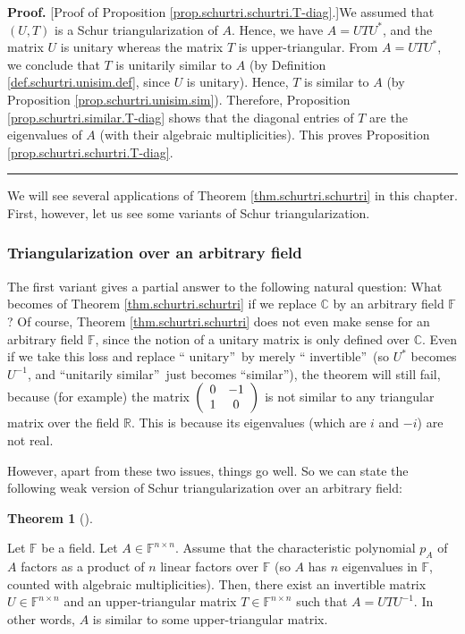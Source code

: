 \documentclass[numbers=enddot,12pt,final,onecolumn,notitlepage]{scrartcl}%
\numberwithin{exer}{subsection}
\theoremstyle{definition}
\newtheorem{theo}{Theorem}[subsection]
\newenvironment{theorem}[1][]
{\begin{theo}[#1]\begin{leftbar}}
{\end{leftbar}\end{theo}}
\newenvironment{proof}[1][Proof]{\noindent\textbf{#1.} }{\ \rule{0.5em}{0.5em}}
\begin{document}
\begin{proof}
[Proof of Proposition \ref{prop.schurtri.schurtri.T-diag}.]We assumed that
$\left(  U,T\right)  $ is a Schur triangularization of $A$. Hence, we have
$A=UTU^{\ast}$, and the matrix $U$ is unitary whereas the matrix $T$ is
upper-triangular. From $A=UTU^{\ast}$, we conclude that $T$ is unitarily
similar to $A$ (by Definition \ref{def.schurtri.unisim.def}, since $U$ is
unitary). Hence, $T$ is similar to $A$ (by Proposition
\ref{prop.schurtri.unisim.sim}). Therefore, Proposition
\ref{prop.schurtri.similar.T-diag} shows that the diagonal entries of $T$ are
the eigenvalues of $A$ (with their algebraic multiplicities). This proves
Proposition \ref{prop.schurtri.schurtri.T-diag}.
\end{proof}

We will see several applications of Theorem \ref{thm.schurtri.schurtri} in
this chapter. First, however, let us see some variants of Schur triangularization.

\subsubsection{Triangularization over an arbitrary field}

The first variant gives a partial answer to the following natural question:
What becomes of Theorem \ref{thm.schurtri.schurtri} if we replace $\mathbb{C}$
by an arbitrary field $\mathbb{F}$ ? Of course, Theorem
\ref{thm.schurtri.schurtri} does not even make sense for an arbitrary field
$\mathbb{F}$, since the notion of a unitary matrix is only defined over
$\mathbb{C}$. Even if we take this loss and replace \textquotedblleft
unitary\textquotedblright\ by merely \textquotedblleft
invertible\textquotedblright\ (so $U^{\ast}$ becomes $U^{-1}$, and
\textquotedblleft unitarily similar\textquotedblright\ just becomes
\textquotedblleft similar\textquotedblright), the theorem will still fail,
because (for example) the matrix $\left(
\begin{array}
[c]{cc}%
0 & -1\\
1 & 0
\end{array}
\right)  $ is not similar to any triangular matrix over the field $\mathbb{R}%
$. This is because its eigenvalues (which are $i$ and $-i$) are not real.

However, apart from these two issues, things go well. So we can state the
following weak version of Schur triangularization over an arbitrary field:

\begin{theorem}
[triangularization theorem]\label{thm.schurtri.invtri}Let $\mathbb{F}$ be a
field. Let $A\in\mathbb{F}^{n\times n}$. Assume that the characteristic
polynomial $p_{A}$ of $A$ factors as a product of $n$ linear factors over
$\mathbb{F}$ (so $A$ has $n$ eigenvalues in $\mathbb{F}$, counted with
algebraic multiplicities). Then, there exist an invertible matrix
$U\in\mathbb{F}^{n\times n}$ and an upper-triangular matrix $T\in
\mathbb{F}^{n\times n}$ such that $A=UTU^{-1}$. In other words, $A$ is similar
to some upper-triangular matrix.
\end{theorem}
\end{document}
